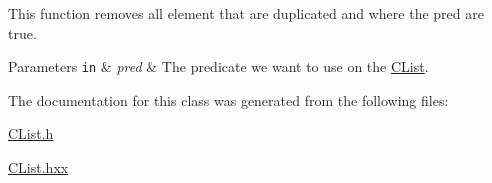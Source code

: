 This function removes all element that are duplicated and where the {\ttfamily pred} are true. 


\begin{DoxyParams}[1]{Parameters}
\mbox{\tt in}  & {\em pred} & The predicate we want to use on the \hyperlink{classnsSdD_1_1CList}{C\+List}. \\
\hline
\end{DoxyParams}


The documentation for this class was generated from the following files\+:\begin{DoxyCompactItemize}
\item 
\hyperlink{CList_8h}{C\+List.\+h}\item 
\hyperlink{CList_8hxx}{C\+List.\+hxx}\end{DoxyCompactItemize}

